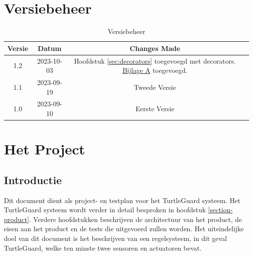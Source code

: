 \documentclass[a4paper]{report}
\newcommand{\turtleguard}{\mbox{TurtleGuard\texttrademark}\xspace}
\begin{document}
\tableofcontents

\chapter*{Versiebeheer}
\thispagestyle{empty}  %
\begin{table}[h]
    \centering
    \begin{tabular}{|c|c|c|p{5cm}|}
        \hline
        Versie & Datum      & Changes Made  \\
        \hline
        1.2    & 2023-10-03 & Hoofdstuk \ref{sec:decorators} toegevoegd met decorators. \hyperref[sec:bijlageA]{Bijlage A} toegevoegd.\\
        \hline
        1.1    & 2023-09-19 & Tweede Versie \\
        \hline
        1.0    & 2023-09-10 & Eerste Versie \\
        \hline
    \end{tabular}
    \caption{Versiebeheer}
\end{table}
\clearpage  %

\chapter{Het Project}
\section{Introductie}
Dit document dient als project- en testplan voor het \turtleguard systeem. Het \turtleguard systeem wordt verder in detail besproken in hoofdstuk \ref{section-product}.
Verdere hoofdstukken beschrijven de architectuur van het product, de eisen aan het product en de tests die uitgevoerd zullen worden.
Het uiteindelijke doel van dit document is het beschrijven van een regelsysteem, in dit geval \turtleguard, welke ten minste twee sensoren en actuatoren bevat. 
\end{document}

